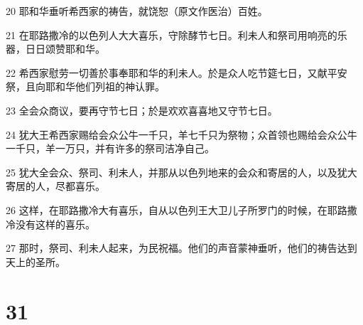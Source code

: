 \par 20 耶和华垂听希西家的祷告，就饶恕（原文作医治）百姓。
\par 21 在耶路撒冷的以色列人大大喜乐，守除酵节七日。利未人和祭司用响亮的乐器，日日颂赞耶和华。
\par 22 希西家慰劳一切善於事奉耶和华的利未人。於是众人吃节筵七日，又献平安祭，且向耶和华他们列祖的神认罪。
\par 23 全会众商议，要再守节七日；於是欢欢喜喜地又守节七日。
\par 24 犹大王希西家赐给会众公牛一千只，羊七千只为祭物；众首领也赐给会众公牛一千只，羊一万只，并有许多的祭司洁净自己。
\par 25 犹大全会众、祭司、利未人，并那从以色列地来的会众和寄居的人，以及犹大寄居的人，尽都喜乐。
\par 26 这样，在耶路撒冷大有喜乐，自从以色列王大卫儿子所罗门的时候，在耶路撒冷没有这样的喜乐。
\par 27 那时，祭司、利未人起来，为民祝福。他们的声音蒙神垂听，他们的祷告达到天上的圣所。

\chapter{31}

